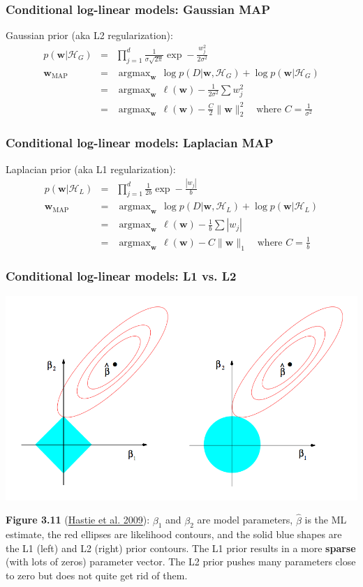 \documentclass[ignorenonframetext,plain]{beamer}
\DeclareMathOperator*{\argmax}{argmax}
\renewcommand{\vec}{\mathbf}
\begin{document}
\begin{frame}\frametitle{Conditional log-linear models: Gaussian MAP} %
Gaussian prior (aka L2 regularization):\begin{eqnarray*}
p(\vec{w}|\mathcal{H}_G) &=& \prod_{j=1}^d \frac{1}{\sigma \sqrt{2\pi}}
\exp -\frac{w_j^2}{2\sigma^2} \\
\vec{w}_\text{MAP} &=& \argmax_\vec{w}\, \log p(D|\vec{w},\mathcal{H}_G)
+ \log p(\vec{w}|\mathcal{H}_G) \\
&=& \argmax_\vec{w}\, \ell(\vec{w}) -\frac{1}{2\sigma^2}\sum w_j^2 \\
&=& \argmax_\vec{w}\, \ell(\vec{w}) - \frac{C}{2}\|\vec{w}\|_2^2 \quad\text{where }C=\frac{1}{\sigma^2}
\end{eqnarray*}
\end{frame}
\begin{frame}\frametitle{Conditional log-linear models: Laplacian MAP} %
Laplacian prior (aka L1 regularization):\begin{eqnarray*}
p(\vec{w}|\mathcal{H}_L) &=& \prod_{j=1}^d \frac{1}{2b} \exp -\frac{|w_j|}{b}\\
\vec{w}_\text{MAP} &=& \argmax_\vec{w}\, \log p(D|\vec{w},\mathcal{H}_L)
+ \log p(\vec{w}|\mathcal{H}_L) \\
&=& \argmax_\vec{w}\, \ell(\vec{w}) -\frac{1}{b}\sum |w_j| \\
&=& \argmax_\vec{w}\, \ell(\vec{w}) - C \|\vec{w}\|_1 \quad\text{where }C=\frac{1}{b}
\end{eqnarray*}
\end{frame}

\begin{frame}\frametitle{Conditional log-linear models: L1 vs. L2} %
\includegraphics[width=.9\textwidth]{images/hastie-fig-3-11.png}

\footnotesize {\bf Figure 3.11}
(\href{http://www-stat.stanford.edu/~tibs/ElemStatLearn}{Hastie et
  al. 2009}): $\beta_1$ and $\beta_2$ are model parameters,
$\hat{\beta}$ is the ML estimate, the red ellipses are likelihood
contours, and the solid blue shapes are the L1 (left) and L2 (right)
prior contours.  The L1 prior results in a more {\bf sparse} (with
lots of zeros) parameter vector.  The L2 prior pushes many parameters
close to zero but does not quite get rid of them.
\end{frame}
\end{document}
